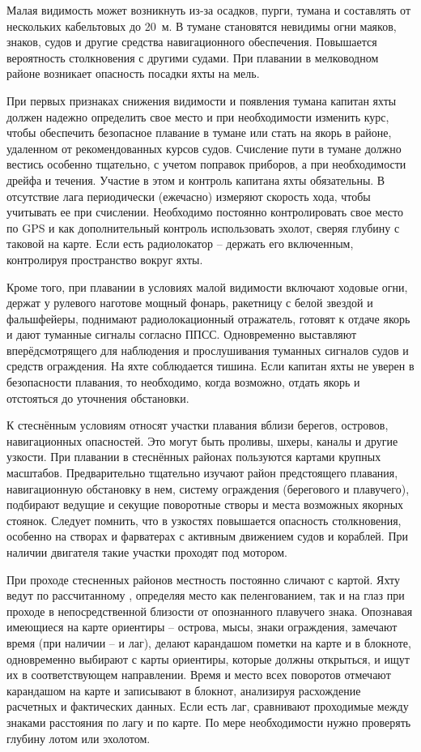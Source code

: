 Малая видимость может возникнуть из-за осадков, пурги, тумана и составлять от нескольких кабельтовых до 20~м. В тумане становятся невидимы огни маяков, знаков, судов и другие средства навигационного обеспечения. Повышается вероятность столкновения с другими судами. При плавании в мелководном районе возникает опасность посадки яхты на мель.
 
При первых признаках снижения видимости и появления тумана капитан яхты должен надежно определить свое место и при необходимости изменить курс, чтобы обеспечить безопасное плавание в тумане или стать на якорь в районе, удаленном от рекомендованных курсов судов. Счисление пути в тумане должно вестись особенно тщательно, с учетом поправок приборов, а при необходимости дрейфа и течения. Участие в этом и контроль капитана яхты обязательны. В отсутствие лага периодически (ежечасно) измеряют скорость хода, чтобы учитывать ее при счислении. Необходимо постоянно контролировать свое место по GPS и как дополнительный контроль использовать эхолот, сверяя глубину с таковой на карте. Если есть радиолокатор \--- держать его включенным, контролируя пространство вокруг яхты.
 
Кроме того, при плавании в условиях малой видимости включают ходовые огни, держат у рулевого наготове мощный фонарь, ракетницу с белой звездой и фальшфейеры, поднимают радиолокационный отражатель, готовят к отдаче якорь и дают туманные сигналы согласно ППСС. Одновременно выставляют вперёдсмотрящего для наблюдения и прослушивания туманных сигналов судов и средств ограждения. На яхте соблюдается тишина. Если капитан яхты не уверен в безопасности плавания, то необходимо, когда возможно, отдать якорь и отстояться до уточнения обстановки.
 
К стеснённым условиям относят участки плавания вблизи берегов, островов, навигационных опасностей. Это могут быть проливы, шхеры, каналы и другие узкости. При плавании в стеснённых районах пользуются картами крупных масштабов. Предварительно тщательно изучают район предстоящего плавания, навигационную обстановку в нем, систему ограждения (берегового и плавучего), подбирают ведущие и секущие поворотные створы и места возможных якорных стоянок. Следует помнить, что в узкостях повышается опасность столкновения, особенно на створах и фарватерах с активным движением судов и кораблей. При наличии двигателя такие участки проходят под мотором. 

При проходе стесненных районов местность постоянно сличают с картой. Яхту ведут по рассчитанному \KK, определяя место как пеленгованием, так и на глаз при проходе в непосредственной близости от опознанного плавучего знака. Опознавая имеющиеся на карте ориентиры \--- острова, мысы, знаки ограждения, замечают время (при наличии \--- и лаг), делают карандашом пометки на карте и в блокноте, одновременно выбирают с карты ориентиры, которые должны открыться, и ищут их в соответствующем направлении. Время и место всех поворотов отмечают карандашом на карте и записывают в блокнот, анализируя расхождение расчетных и фактических данных. Если есть лаг, сравнивают проходимые между знаками расстояния по лагу и по карте. По мере необходимости нужно проверять глубину лотом или эхолотом. 

